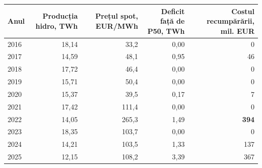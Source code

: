 \begin{tabular}{lrrrr}
\toprule
Anul & Producția hidro, TWh & Prețul spot, EUR/MWh & Deficit față de P50, TWh & Costul recumpărării, mil. EUR \\
\midrule
2016 & 18,14 & 33,2 & 0,00 & 0 \\
2017 & 14,59 & 48,1 & 0,95 & 46 \\
2018 & 17,72 & 46,4 & 0,00 & 0 \\
2019 & 15,71 & 50,4 & 0,00 & 0 \\
2020 & 15,37 & 39,5 & 0,17 & 7 \\
2021 & 17,42 & 111,4 & 0,00 & 0 \\
2022 & 14,05 & 265,3 & 1,49 & \textbf{394} \\
2023 & 18,35 & 103,7 & 0,00 & 0 \\
2024 & 14,21 & 103,5 & 1,33 & 137 \\
2025 & 12,15 & 108,2 & 3,39 & 367 \\
\bottomrule
\end{tabular}
